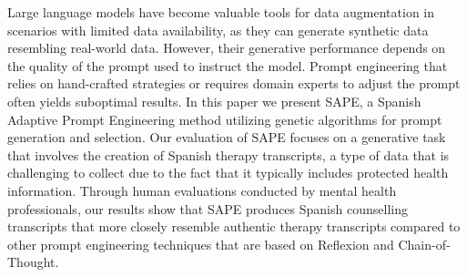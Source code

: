 Large language models have become valuable tools for data augmentation in scenarios with limited data availability, as they can generate synthetic data resembling real-world data. However, their generative performance depends on the quality of the prompt used to instruct the model. Prompt engineering that relies on hand-crafted strategies or requires domain experts to adjust the prompt often yields suboptimal results. In this paper we present SAPE, a Spanish Adaptive Prompt Engineering method utilizing genetic algorithms for prompt generation and selection. Our evaluation of SAPE focuses on a generative task that involves the creation of Spanish therapy transcripts, a type of data that is challenging to collect due to the fact that it typically includes  protected health information. Through human evaluations conducted by mental health professionals, our results show that SAPE produces Spanish counselling transcripts that more closely resemble authentic therapy transcripts compared to other prompt engineering techniques that are based on Reflexion and Chain-of-Thought.